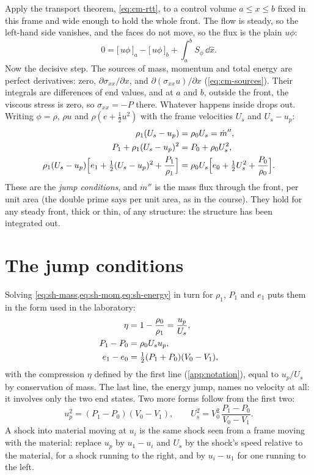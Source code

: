 Apply the transport theorem, \cref{eq:cm-rtt}, to a control volume $a \le
x \le b$ fixed in this frame and wide enough to hold the whole front. The
flow is steady, so the left-hand side vanishes, and the faces do not move,
so the flux is the plain $u\phi$:
\begin{equation}
0 = \bigl[\,u\phi\,\bigr]_{a} - \bigl[\,u\phi\,\bigr]_{b}
  + \int_a^b S_\phi\,\dd\hat x .
\label{eq:sh-cv}
\end{equation}
Now the decisive step. The sources of mass, momentum and total energy are
perfect derivatives: zero, $\partial\sigma_{xx}/\partial x$, and
$\partial(\sigma_{xx}u)/\partial x$ (\cref{eq:cm-sources}). Their integrals
are differences of end values, and at $a$ and $b$, outside the front, the
viscous stress is zero, so $\sigma_{xx} = -P$ there. Whatever happens
inside drops out. Writing $\phi = \rho$, $\rho u$ and $\rho(e +
\tfrac{1}{2}u^2)$ with the frame velocities $U_s$ and $U_s - u_p$:
\begin{align}
\rho_1 (U_s - u_p) &= \rho_0 U_s = \dot m'',
\label{eq:sh-mass}\\
P_1 + \rho_1 (U_s - u_p)^2 &= P_0 + \rho_0 U_s^2,
\label{eq:sh-mom}\\
\rho_1 (U_s - u_p)\Bigl[e_1 + \tfrac{1}{2}(U_s - u_p)^2 + \frac{P_1}{\rho_1}\Bigr]
  &= \rho_0 U_s\Bigl[e_0 + \tfrac{1}{2}U_s^2 + \frac{P_0}{\rho_0}\Bigr].
\label{eq:sh-energy}
\end{align}
These are the \emph{jump conditions}, and $\dot m''$ is the mass flux
through the front, per unit area (the double prime says per unit area, as
in the course). They hold for any steady front, thick or thin,
of any structure: the structure has been integrated out.

\section{The jump conditions}
\label{sec:jumps}

Solving \cref{eq:sh-mass,eq:sh-mom,eq:sh-energy} in turn for $\rho_1$,
$P_1$ and $e_1$ puts them in the form used in the laboratory:
\begin{align}
\eta &= 1 - \frac{\rho_0}{\rho_1} = \frac{u_p}{U_s},
\label{eq:sh-eta}\\
P_1 - P_0 &= \rho_0 U_s u_p,
\label{eq:sh-p}\\
e_1 - e_0 &= \tfrac{1}{2}(P_1 + P_0)(V_0 - V_1),
\label{eq:sh-hug-energy}
\end{align}
with the compression $\eta$ defined by the first line
(\cref{app:notation}), equal to $u_p/U_s$ by conservation of mass. The last line, the
energy jump, names no velocity at all: it involves only the two end
states. Two more forms follow from the first two:
\begin{equation}
u_p^2 = (P_1 - P_0)(V_0 - V_1),
\qquad
U_s^2 = V_0^2\,\frac{P_1 - P_0}{V_0 - V_1}.
\label{eq:sh-up-us}
\end{equation}
A shock into material moving at $u_i$ is the same shock seen from a frame
moving with the material: replace $u_p$ by $u_1 - u_i$ and $U_s$ by the
shock's speed relative to the material, for a shock running to the right,
and by $u_i - u_1$ for one running to the left.

